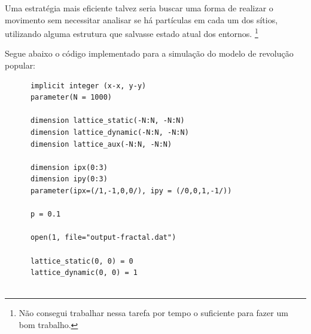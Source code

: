 \documentclass[a4paper, 11pt]{tufte-handout}
\begin{document}
Uma estratégia mais eficiente talvez seria buscar uma forma de realizar o movimento sem necessitar
analisar se há partículas em cada um dos sítios, utilizando alguma estrutura que salvasse estado
atual dos entornos. \footnote{Não consegui trabalhar nessa tarefa por tempo o suficiente para fazer
  um bom trabalho.}


Segue abaixo o código implementado para a simulação do modelo de revolução popular:


\begin{verbatim}
      implicit integer (x-x, y-y)
      parameter(N = 1000)

      dimension lattice_static(-N:N, -N:N)
      dimension lattice_dynamic(-N:N, -N:N)
      dimension lattice_aux(-N:N, -N:N)

      dimension ipx(0:3)
      dimension ipy(0:3)
      parameter(ipx=(/1,-1,0,0/), ipy = (/0,0,1,-1/))

      p = 0.1

      open(1, file="output-fractal.dat")

      lattice_static(0, 0) = 0
      lattice_dynamic(0, 0) = 1


\end{verbatim}
\end{document}
